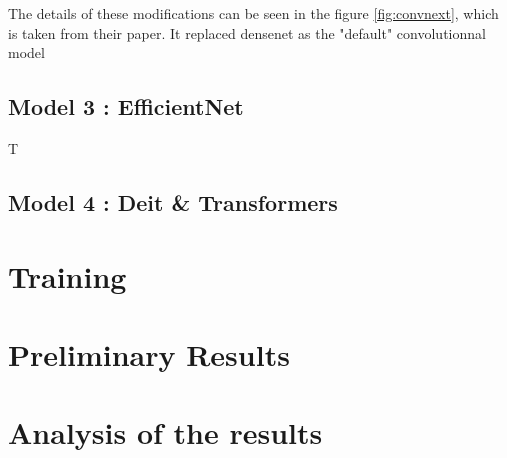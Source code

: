 \documentclass[11pt]{article}
\begin{document}
        The details of these modifications can be seen in the figure \ref{fig:convnext}, which is taken from their paper.
        It replaced densenet as the "default" convolutionnal model


    \subsection{Model 3 : EfficientNet \cite{efficientnet}}

        T

    \subsection{Model 4 : Deit \& Transformers \cite{deit} \cite{image16x16}}



    \section{Training}

    \section{Preliminary Results}





    \section{Analysis of the results}



    \newpage
    {
    \small
    \printbibliography
    }
\end{document}
